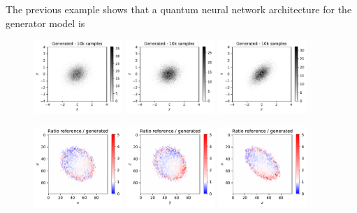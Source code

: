 \documentclass[twocolumn,preprintnumbers,superscriptaddress]{revtex4-2}
\begin{document}
The previous example shows that a quantum neural network architecture for the
generator model is


\begin{figure}

  \includegraphics[width=0.3\textwidth]{plots/3Dgaussian_posdef/1-2_FAKE_10k.pdf}%
  \includegraphics[width=0.3\textwidth]{plots/3Dgaussian_posdef/2-3_FAKE_10k.pdf}%
  \includegraphics[width=0.3\textwidth]{plots/3Dgaussian_posdef/3-1_FAKE_10k.pdf}

  \includegraphics[width=0.3\textwidth]{plots/3Dgaussian_posdef/1-2_RATIO_10k.pdf}%
  \includegraphics[width=0.3\textwidth]{plots/3Dgaussian_posdef/2-3_RATIO_10k.pdf}%
  \includegraphics[width=0.3\textwidth]{plots/3Dgaussian_posdef/3-1_RATIO_10k.pdf}


\end{figure}
\end{document}

